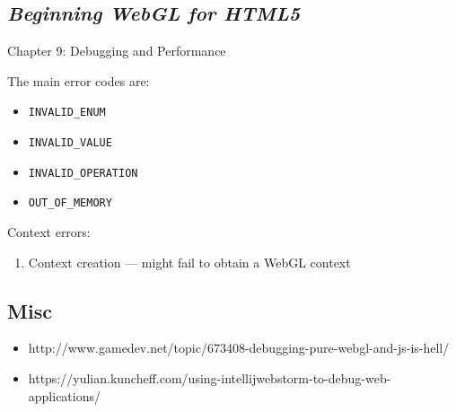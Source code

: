 \subsection{\texorpdfstring{\emph{Beginning WebGL for
HTML5}}{Beginning WebGL for HTML5}}\label{beginning-webgl-for-html5}

Chapter 9: Debugging and Performance

The main error codes are:

\begin{itemize}
\tightlist
\item
  \texttt{INVALID\_ENUM}
\item
  \texttt{INVALID\_VALUE}
\item
  \texttt{INVALID\_OPERATION}
\item
  \texttt{OUT\_OF\_MEMORY}
\end{itemize}

Context errors:

\begin{enumerate}
\def\labelenumi{\arabic{enumi}.}
\tightlist
\item
  Context creation --- might fail to obtain a WebGL context
\end{enumerate}

\subsection{Misc}\label{misc}

\begin{itemize}
\tightlist
\item
  http://www.gamedev.net/topic/673408-debugging-pure-webgl-and-js-is-hell/
\item
  https://yulian.kuncheff.com/using-intellijwebstorm-to-debug-web-applications/
\end{itemize}
